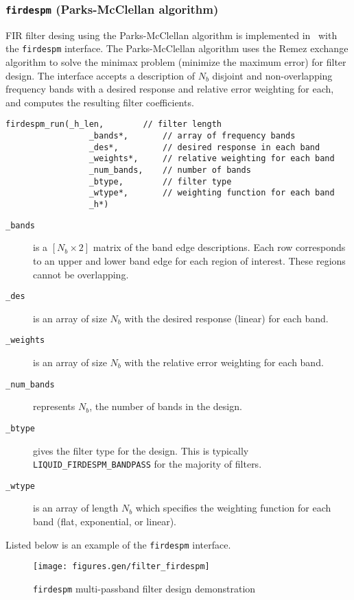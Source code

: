 \subsubsection{{\tt firdespm} (Parks-McClellan algorithm)}
\label{module:filter:firdespm}
FIR filter desing using the Parks-McClellan algorithm is implemented in
\liquid\ with the {\tt firdespm} interface.
The Parks-McClellan algorithm uses the Remez exchange algorithm to solve
the minimax problem (minimize the maximum error) for filter design.
The interface accepts a description of $N_b$ disjoint and
non-overlapping frequency bands with a desired response and relative
error weighting for each, and computes the resulting filter
coefficients.
%
\begin{Verbatim}[fontsize=\small]
    firdespm_run(_h_len,        // filter length
                 _bands*,       // array of frequency bands
                 _des*,         // desired response in each band
                 _weights*,     // relative weighting for each band
                 _num_bands,    // number of bands
                 _btype,        // filter type
                 _wtype*,       // weighting function for each band
                 _h*)
\end{Verbatim}
%
\begin{description}
\item[{\tt \_bands}]
    is a $[N_b \times 2]$ matrix of the band edge descriptions.
    Each row corresponds to an upper and lower band edge for each region
    of interest.
    These regions cannot be overlapping.
\item[{\tt \_des}]
    is an array of size $N_b$ with the desired response (linear) for
    each band.
\item[{\tt \_weights}]
    is an array of size $N_b$ with the relative error weighting for each
    band.
\item[{\tt \_num\_bands}]
    represents $N_b$, the number of bands in the design.
\item[{\tt \_btype}]
    gives the filter type for the design.
    This is typically {\tt LIQUID\_FIRDESPM\_BANDPASS} for the majority
    of filters.
\item[{\tt \_wtype}]
    is an array of length $N_b$ which specifies the weighting function
    for each band (flat, exponential, or linear).
\end{description}
%
Listed below is an example of the {\tt firdespm} interface.
%



\begin{figure}
\centering
  \texttt{[image: figures.gen/filter\_firdespm]}
\caption{{\tt firdespm} multi-passband filter design demonstration}
\label{fig:module:filter:firdespm}
\end{figure}

